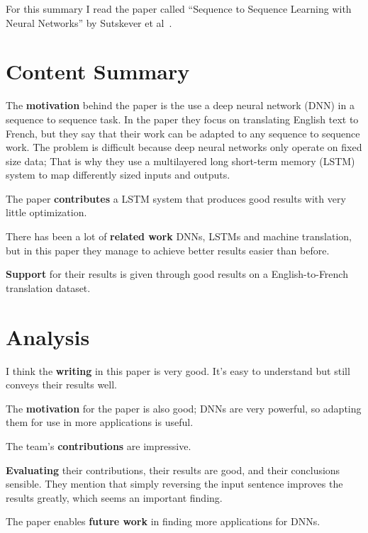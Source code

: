 For this summary I read the paper called ``Sequence to Sequence Learning with
Neural Networks'' by Sutskever et al~\cite{NIPS2014_5346}.

\section{Content Summary}

The \textbf{motivation} behind the paper is the use a deep neural network (DNN)
in a sequence to sequence task. In the paper they focus on translating English
text to French, but they say that their work can be adapted to any sequence to
sequence work. The problem is difficult because deep neural networks only
operate on fixed size data; That is why they use a multilayered long short-term
memory (LSTM) system to map differently sized inputs and outputs.

The paper \textbf{contributes} a LSTM system that produces good results with
very little optimization.

There has been a lot of \textbf{related work} DNNs, LSTMs and machine
translation, but in this paper they manage to achieve better results easier
than before.

\textbf{Support} for their results is given through good results on a
English-to-French translation dataset.


\section{Analysis}

I think the \textbf{writing} in this paper is very good. It's easy to
understand but still conveys their results well.

The \textbf{motivation} for the paper is also good; DNNs are very powerful, so
adapting them for use in more applications is useful.

The team's \textbf{contributions} are impressive.

\textbf{Evaluating} their contributions, their results are good, and their
conclusions sensible. They mention that simply reversing the input sentence
improves the results greatly, which seems an important finding.

The paper enables \textbf{future work} in finding more applications for DNNs.
